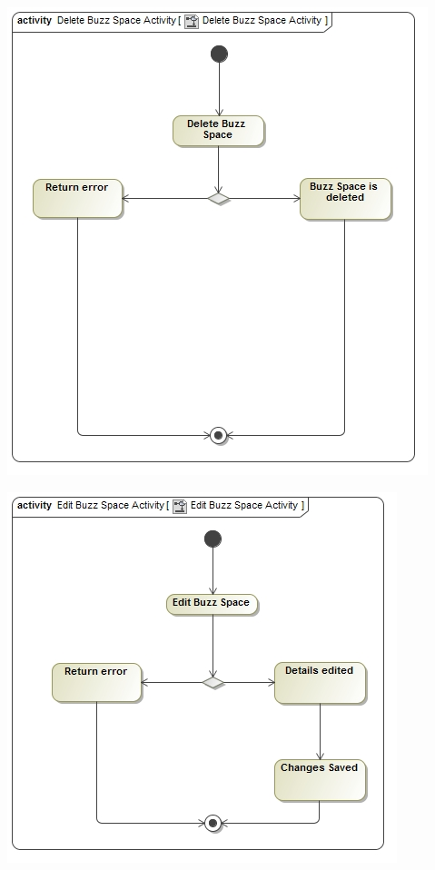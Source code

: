 \documentclass[12pt, oneside]{article}
\begin{document}
		 \includegraphics[scale=0.55]{Activity_Diagram__Delete_Buzz_Space_Activity__Delete_Buzz_Space_Activity}
		 \newline
		 
		 \includegraphics[scale=0.55]{Activity_Diagram__Edit_Buzz_Space_Activity__Edit_Buzz_Space_Activity}
		 \newline
		 
\end{document}
